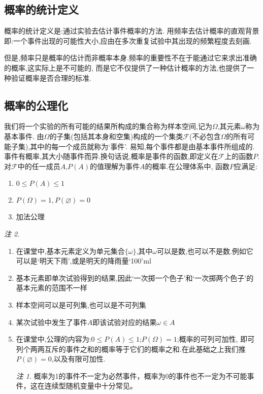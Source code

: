 \documentclass[a4paper,11pt]{article}%
\theoremstyle{remark}
\newtheorem*{remark}{注}
\theoremstyle{remark}
\theoremstyle{definition}
\theoremstyle{definition}
\theoremstyle{plain}
\begin{document}
\subsection{概率的统计定义}
概率的统计定义是:通过实验去估计事件概率的方法.
用频率去估计概率的直观背景即:一个事件出现的可能性大小,应由在多次重复试验中其出现的频繁程度去刻画.

但是,频率只是概率的估计而非概率本身.频率的重要性不在于能通过它来求出准确的概率,这实际上是不可能的,
而是它不仅提供了一种估计概率的方法,也提供了一种验证概率是否合理的标准.
\subsection{概率的公理化}
我们将一个实验的所有可能的结果所构成的集合称为样本空间,记为$\Omega$,其元素$\omega$称为基本事件.
由$\Omega$的子集(包括其本身和空集)构成的一个集类$\mathcal{F}$(不必包含$\Omega$的所有可能子集),其中的每一个成员就称为`事件'.
易知,每个事件都是由基本事件所组成的.事件有概率,其大小随事件而异.换句话说,概率是事件的函数,即定义在$\mathcal{F}$上的函数$P$.
对$\mathcal{F}$中的任一成员$A$,$P(A)$的值理解为事件$A$的概率.在公理体系中, 函数$P$应满足:
\begin{enumerate}
    \item$0\leq P(A)\leq 1$
    \item$P(\Omega)=1,P(\varnothing)=0$
    \item 加法公理
\end{enumerate}
\begin{remark}
    \begin{enumerate}
        \item 在课堂中,基本元素定义为单元集合$\{\omega\}$,其中$\omega$可以是数,也可以不是数.例如它可以是`明天下雨',或是明天的降雨量`100'ml
        \item 基本元素即单次试验得到的结果,因此`一次掷一个色子'和`一次掷两个色子'的基本元素的范围不一样
        \item 样本空间可以是可列集,也可以是不可列集
        \item 某次试验中发生了事件$A$即该试验对应的结果$\omega\in A$
        \item 在课堂中,公理的内容为:$0\leq P(A)\leq 1$;$P(\Omega)=1$;概率的可列可加性,
        即可列个两两互斥的事件之和的概率等于它们的概率之和.在此基础之上我们推$P(\varnothing)=0$,以及有限可加性.
        \begin{remark}
            概率为1的事件不一定为必然事件，概率为0的事件也不一定为不可能事件，这在连续型随机变量中十分常见。
        \end{remark}
    \end{enumerate}
\end{remark}
\end{document}

